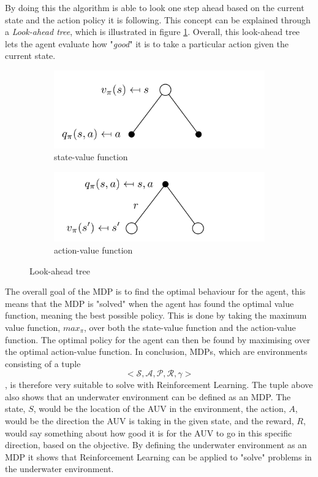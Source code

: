 By doing this the algorithm is able to look one step ahead based on the current state and the action policy it is following. This concept can be explained through a \textit{Look-ahead tree}, which is illustrated in figure \ref{fig:lookahead}. Overall, this look-ahead tree lets the agent evaluate how "\textit{good}" it is to take a particular action given the current state. 
\begin{figure}[H]
    \centering
    \begin{subfigure}[b]{0.45\textwidth}
        \centering
        \includegraphics[width=\textwidth]{images/chap2/look-ahead-value.png}
        \caption{state-value function}
    \end{subfigure}
    \hfill
    \begin{subfigure}[b]{0.45\textwidth}
        \centering
        \includegraphics[width=\textwidth]{images/chap2/look-ahead-action-value.png}
        \caption{action-value function}
    \end{subfigure}
    \caption{Look-ahead tree\cite{Silver}}
    \label{fig:lookahead}
\end{figure}
The overall goal of the MDP is to find the optimal behaviour for the agent, this means that the MDP is "solved" when the agent has found the optimal value function, meaning the best possible policy. This is done by taking the maximum value function, $max_{\pi}$, over both the state-value function and the action-value function. The optimal policy for the agent can then be found by maximising over the optimal action-value function. In conclusion, MDPs, which are environments consisting of a tuple $$<\mathcal{S, A, P, R, \gamma}>$$, is therefore very suitable to solve with Reinforcement Learning. The tuple above also shows that an underwater environment can be defined as an MDP. The state, $S$, would be the location of the AUV in the environment, the action, $A$, would be the direction the AUV is taking in the given state, and the reward, $R$, would say something about how good it is for the AUV to go in this specific direction, based on the objective. By defining the underwater environment as an MDP it shows that Reinforcement Learning can be applied to "solve" problems in the underwater environment.
